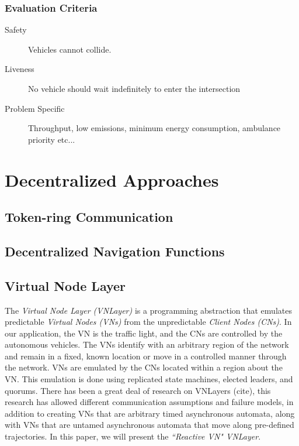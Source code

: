 \documentclass[12pt]{article}
\begin{document}
\subsubsection{Evaluation Criteria}

\begin{description}
\item[Safety] Vehicles cannot collide.   
\item[Liveness] No vehicle should wait indefinitely to enter the intersection
\item[Problem Specific]
Throughput, low emissions, minimum energy consumption, ambulance priority  etc...
\end{description}

\section{Decentralized Approaches}
\label{sec:decentralizedApproaches}
\subsection{Token-ring Communication}
\label{sec:tokenRing}
\subsection{Decentralized Navigation Functions}
\label{sec:DNF}
\subsection{Virtual Node Layer}
\label{sec:VNLayer}

The {\em Virtual Node Layer (VNLayer)} is a programming abstraction that emulates predictable {\em Virtual Nodes (VNs)} from the unpredictable {\em Client Nodes (CNs)}. In our application, the VN is the traffic light, and the CNs are controlled by the autonomous vehicles.  The VNs identify with an arbitrary region of the network and remain in a fixed, known location  or move in a controlled manner through the network.  VNs are emulated by the CNs located within a region about the VN.  This emulation is done using replicated state machines, elected leaders, and quorums.  
There has been a great deal of research on VNLayers  (cite), this research has allowed different communication assumptions and failure models, in addition to creating VNs that are arbitrary timed asynchronous automata, along with VNs that are untamed asynchronous automata that move along pre-defined trajectories. In this paper, we will present the {\em ``Reactive VN" VNLayer}.\cite{inlayer}
\end{document}
